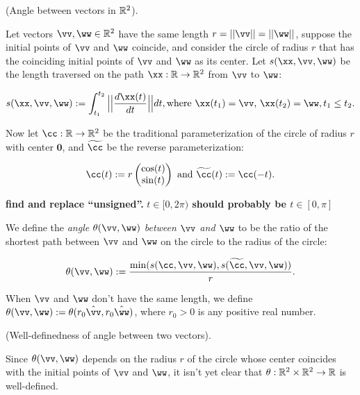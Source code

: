 \begin{defn}
\label{ch::lin_alg::defn::angle_in_R2}
    (Angle between vectors in $\mathbb{R}^2$).
    
    Let vectors $\vv, \ww \in \R^2$ have the same length $r = ||\vv|| = ||\ww||$, suppose the initial points of $\vv$ and $\ww$ coincide, and consider the circle of radius $r$ that has the coinciding initial points of $\vv$ and $\ww$ as its center. Let $s(\xx, \vv, \ww)$ be the length traversed on the path $\xx:\R \rightarrow \R^2$ from $\vv$ to $\ww$:

    \begin{align*}
        s(\xx, \vv, \ww) :=  \int_{t_1}^{t_2} \Big|\Big|\frac{d\xx(t)}{dt}\Big|\Big| dt, 
        \text{where $\xx(t_1) = \vv$, $\xx(t_2) = \ww$}, t_1 \leq t_2.
    \end{align*}

    Now let $\cc:\R \rightarrow \R^2$ be the traditional parameterization of the circle of radius $r$ with center $\mathbf{0}$, and $\widetilde{\cc}$ be the reverse parameterization:

    \begin{align*}
        \cc(t) := r
        \begin{pmatrix}
            \cos(t) \\
            \sin(t)
        \end{pmatrix}
        \text{ and }
        \widetilde{\cc}(t) := \cc(-t).
    \end{align*}
    
    \textbf{find and replace ``unsigned''.}
    \textbf{$t \in [0, 2\pi)$ should probably be $t \in [0, \pi]$}

    We define the \textit{angle $\theta(\vv, \ww)$ between $\vv$ and $\ww$} to be the ratio of the shortest path between $\vv$ and $\ww$ on the circle to the radius of the circle:
    
    \begin{align*}
        \theta(\vv, \ww) := \frac{\min(s(\cc, \vv, \ww), s(\widetilde{\cc}, \vv, \ww))}{r}.
    \end{align*}
    
    When $\vv$ and $\ww$ don't have the same length, we define $\theta(\vv, \ww) := \theta(r_0\hvv, r_0\hww)$, where $r_0 > 0$ is any positive real number.
\end{defn}

\begin{remark}
    (Well-definedness of angle between two vectors).

    Since $\theta(\vv, \ww)$ depends on the radius $r$ of the circle whose center coincides with the initial points of $\vv$ and $\ww$, it isn't yet clear that $\theta:\mathbb{R}^2 \times \mathbb{R}^2 \rightarrow \mathbb{R}$ is well-defined.
\end{remark}

